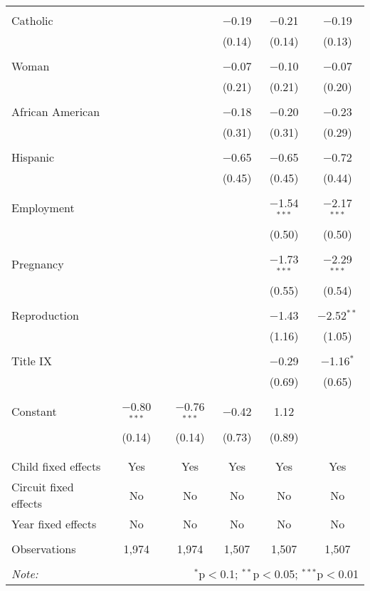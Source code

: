 \begin{table}[h]
\begin{adjustbox}{width=1\textwidth}
\begin{tabular}{@{\extracolsep{5pt}}lccccc}
  & & & & & \\ 
 Catholic &  &  & $-$0.19 & $-$0.21 & $-$0.19 \\ 
  &  &  & (0.14) & (0.14) & (0.13) \\ 
  & & & & & \\ 
 Woman &  &  & $-$0.07 & $-$0.10 & $-$0.07 \\ 
  &  &  & (0.21) & (0.21) & (0.20) \\ 
  & & & & & \\ 
 African American &  &  & $-$0.18 & $-$0.20 & $-$0.23 \\ 
  &  &  & (0.31) & (0.31) & (0.29) \\ 
  & & & & & \\ 
 Hispanic &  &  & $-$0.65 & $-$0.65 & $-$0.72 \\ 
  &  &  & (0.45) & (0.45) & (0.44) \\ 
  & & & & & \\ 
 Employment &  &  &  & $-$1.54$^{***}$ & $-$2.17$^{***}$ \\ 
  &  &  &  & (0.50) & (0.50) \\ 
  & & & & & \\ 
 Pregnancy &  &  &  & $-$1.73$^{***}$ & $-$2.29$^{***}$ \\ 
  &  &  &  & (0.55) & (0.54) \\ 
  & & & & & \\ 
 Reproduction &  &  &  & $-$1.43 & $-$2.52$^{**}$ \\ 
  &  &  &  & (1.16) & (1.05) \\ 
  & & & & & \\ 
 Title IX &  &  &  & $-$0.29 & $-$1.16$^{*}$ \\ 
  &  &  &  & (0.69) & (0.65) \\ 
  & & & & & \\ 
 Constant & $-$0.80$^{***}$ & $-$0.76$^{***}$ & $-$0.42 & 1.12 &  \\ 
  & (0.14) & (0.14) & (0.73) & (0.89) &  \\ 
  & & & & & \\ 
\hline \\[-1.8ex] 
Child fixed effects & Yes & Yes & Yes & Yes & Yes \\ 
Circuit fixed effects & No & No & No & No & No \\ 
Year fixed effects & No & No & No & No & No \\ 
\hline \\[-1.8ex] 
Observations & 1,974 & 1,974 & 1,507 & 1,507 & 1,507 \\ 
\hline 
\hline \\[-1.8ex] 
\textit{Note:}  & \multicolumn{5}{r}{$^{*}$p$<$0.1; $^{**}$p$<$0.05; $^{***}$p$<$0.01} \\ 
\end{tabular}\end{adjustbox}
\end{table} 
